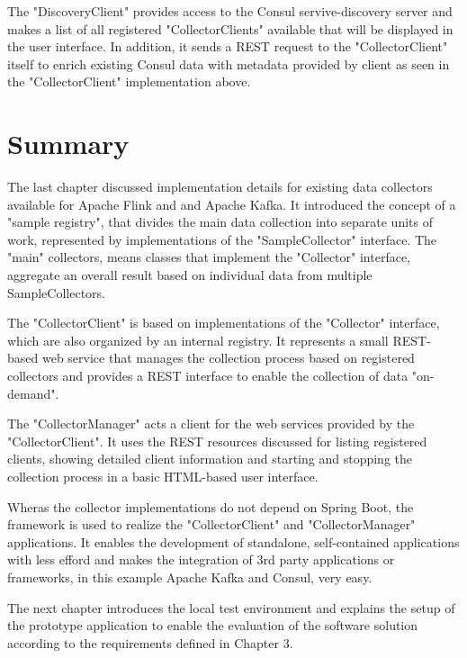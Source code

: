 The "DiscoveryClient" provides access to the Consul servive-discovery server and makes a list of all registered "CollectorClients"
available that will be displayed in the user interface. In addition, it sends a REST request to the "CollectorClient" itself to enrich
existing Consul data with metadata provided by client as seen in the "CollectorClient" implementation above.

\section{Summary}

The last chapter discussed implementation details for existing data collectors available for Apache Flink and and Apache Kafka.
It introduced the concept of a "sample registry", that divides the main data collection into separate units of work, represented
by implementations of the "SampleCollector" interface. The "main" collectors, means classes that implement the "Collector"
interface, aggregate an overall result based on individual data from multiple SampleCollectors.

The "CollectorClient" is based on implementations of the "Collector" interface, which are also organized by an internal registry.
It represents a small REST-based web service that manages the collection process based on registered collectors and provides a REST
interface to enable the collection of data "on-demand".

The "CollectorManager" acts a client for the web services provided by the "CollectorClient". It uses the REST resources discussed
for listing registered clients, showing detailed client information and starting and stopping the collection process in a basic
HTML-based user interface.

Wheras the collector implementations do not depend on Spring Boot, the framework is used to realize the "CollectorClient" and
"CollectorManager" applications. It enables the development of standalone, self-contained applications with less efford and makes
the integration of 3rd party applications or frameworks, in this example Apache Kafka and Consul, very easy.

The next chapter introduces the local test environment and explains the setup of the prototype application to enable the
evaluation of the software solution according to the requirements defined in Chapter 3.